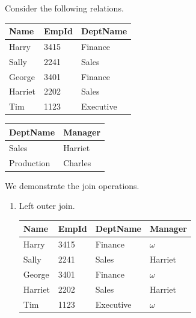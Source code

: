 \documentclass{article}
\begin{document}
      \begin{example}
        Consider the following relations. 

        \begin{center}
          \begin{minipage}{0.5\textwidth}
            \centering
            \begin{tabular}{|l|l|l|}
            \hline
            Name & EmpId & DeptName \\
            \hline
            Harry & 3415 & Finance \\
            Sally & 2241 & Sales \\
            George & 3401 & Finance \\
            Harriet & 2202 & Sales \\
            Tim & 1123 & Executive \\
            \hline
            \end{tabular}
          \end{minipage}%
          \begin{minipage}{0.5\textwidth}
            \centering
            \begin{tabular}{|l|l|}
            \hline
            DeptName & Manager \\
            \hline
            Sales & Harriet \\
            Production & Charles \\
            \hline
            \end{tabular}
          \end{minipage}
        \end{center}

        We demonstrate the join operations. 
        \begin{enumerate}
          \item Left outer join. 
          \begin{center}
            \begin{tabular}{|l|l|l|l|}
            \hline
            Name & EmpId & DeptName & Manager \\
            \hline
            Harry & 3415 & Finance & $\omega$ \\
            Sally & 2241 & Sales & Harriet \\
            George & 3401 & Finance & $\omega$ \\
            Harriet & 2202 & Sales & Harriet \\
            Tim & 1123 & Executive & $\omega$ \\
            \hline
            \end{tabular}
          \end{center}


\end{enumerate}
\end{example}
\end{document}
